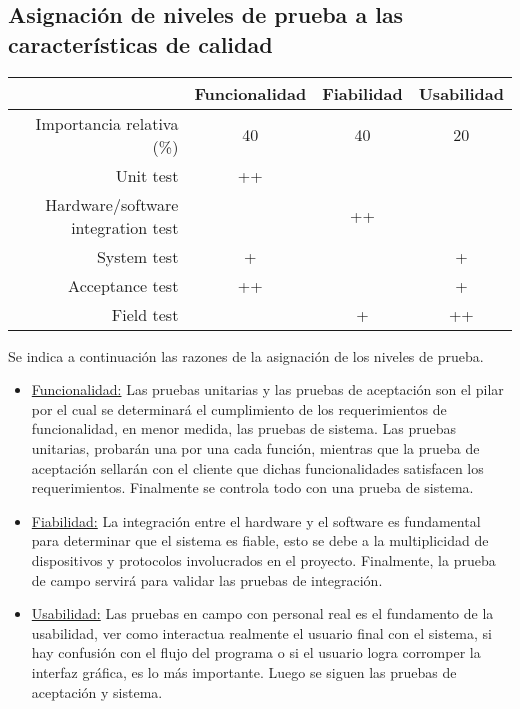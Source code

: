 \documentclass[
11pt,
spanish,
singlespacing,
parskip, 
headsepline,
a4paper
]{article}
\begin{document}
\subsection{Asignación de niveles de prueba a las características de calidad}
\label{subsec:asignacion}
\begin{table}[H]
	\centering
	\begin{tabular}{r|ccc}
		                                   & Funcionalidad & Fiabilidad & Usabilidad \\ \hline
		Importancia relativa (\%)          & 40            & 40         & 20         \\
		Unit test                          & ++            &            &            \\
		Hardware/software integration test &               & ++         &            \\
		System test                        & +             &            & +          \\
		Acceptance test                    & ++            &            & +          \\
		Field test                         &               & +          & ++         \\
	\end{tabular}
\end{table}

Se indica a continuación las razones de la asignación de los niveles de prueba.

\begin{itemize}
\item \underline{Funcionalidad:} Las pruebas unitarias y las pruebas de aceptación son el pilar por el cual se determinará el cumplimiento de los requerimientos de funcionalidad, en menor medida, las pruebas de sistema. Las pruebas unitarias, probarán una por una cada función, mientras que la prueba de aceptación sellarán con el cliente que dichas funcionalidades satisfacen los requerimientos. Finalmente se controla todo con una prueba de sistema.
\item \underline{Fiabilidad:} La integración entre el hardware y el software es fundamental para determinar que el sistema es fiable, esto se debe a la multiplicidad de dispositivos y protocolos involucrados en el proyecto. Finalmente, la prueba de campo servirá para validar las pruebas de integración.
\item \underline{Usabilidad:} Las pruebas en campo con personal real es el fundamento de la usabilidad, ver como interactua realmente el usuario final con el sistema, si hay confusión con el flujo del programa o si el usuario logra corromper la interfaz gráfica, es lo más importante. Luego se siguen las pruebas de aceptación y sistema.
\end{itemize}
\end{document}
